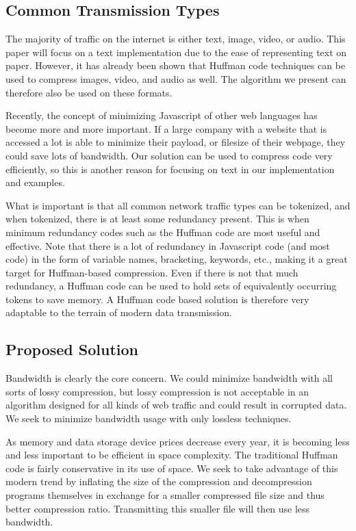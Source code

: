 \subsection{Common Transmission Types}
The majority of traffic on the internet is either text, image, video, or audio. This paper will focus on a text implementation due to the ease of representing text on paper. However, it has already been shown that Huffman code techniques can be used to compress images, video, and audio as well.\cite{huffaudio}\cite{huffimage}\cite{huffvideo} The algorithm we present can therefore also be used on these formats.

Recently, the concept of minimizing Javascript of other web languages has become more and more important. If a large company with a website that is accessed a lot is able to minimize their payload, or filesize of their webpage, they could save lots of bandwidth. Our solution can be used to compress code very efficiently, so this is another reason for focusing on text in our implementation and examples.

What is important is that all common network traffic types can be tokenized, and when tokenized, there is at least some redundancy present. This is when minimum redundancy codes such as the Huffman code are most useful and effective. Note that there is a lot of redundancy in Javascript code (and most code) in the form of variable names, bracketing, keywords, etc., making it a great target for Huffman-based compression. Even if there is not that much redundancy, a Huffman code can be used to hold sets of equivalently occurring tokens to save memory.\cite{huffmemeffic} A Huffman code based solution is therefore very adaptable to the terrain of modern data transmission.

\subsection{Proposed Solution}
Bandwidth is clearly the core concern. We could minimize bandwidth with all sorts of lossy compression, but lossy compression is not acceptable in an algorithm designed for all kinds of web traffic and could result in corrupted data. We seek to minimize bandwidth usage with only lossless techniques.

As memory and data storage device prices decrease every year, it is becoming less and less important to be efficient in space complexity.\cite{mccallum} The traditional Huffman code is fairly conservative in its use of space. We seek to take advantage of this modern trend by inflating the size of the compression and decompression programs themselves in exchange for a smaller compressed file size and thus better compression ratio. Transmitting this smaller file will then use less bandwidth.


